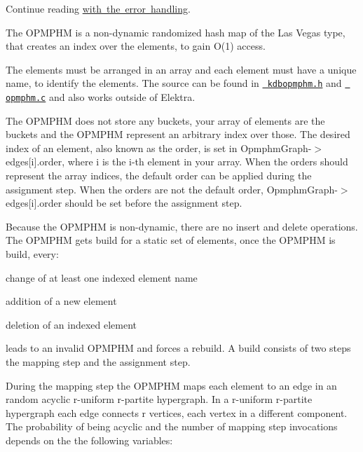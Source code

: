 Continue reading \mbox{\hyperlink{doc_dev_error-handling_md}{with the error handling}}.

The O\+P\+M\+P\+HM is a non-\/dynamic randomized hash map of the Las Vegas type, that creates an index over the elements, to gain O(1) access.

The elements must be arranged in an array and each element must have a unique name, to identify the elements. The source can be found in \href{/home/mpranj/workspace/libelektra/src/include/kdbopmphm.h}{\texttt{ kdbopmphm.\+h}} and \href{/home/mpranj/workspace/libelektra/src/libs/elektra/opmphm.c}{\texttt{ opmphm.\+c}} and also works outside of Elektra.

The O\+P\+M\+P\+HM does not store any buckets, your array of elements are the buckets and the O\+P\+M\+P\+HM represent an arbitrary index over those. The desired index of an element, also known as the order, is set in {\ttfamily Opmphm\+Graph-\/$>$edges\mbox{[}i\mbox{]}.order}, where {\ttfamily i} is the i-\/th element in your array. When the orders should represent the array indices, the default order can be applied during the assignment step. When the orders are not the default order, {\ttfamily Opmphm\+Graph-\/$>$edges\mbox{[}i\mbox{]}.order} should be set before the assignment step.

Because the O\+P\+M\+P\+HM is non-\/dynamic, there are no insert and delete operations. The O\+P\+M\+P\+HM gets build for a static set of elements, once the O\+P\+M\+P\+HM is build, every\+:


\begin{DoxyItemize}
\item change of at least one indexed element name
\item addition of a new element
\item deletion of an indexed element
\end{DoxyItemize}

leads to an invalid O\+P\+M\+P\+HM and forces a rebuild. A build consists of two steps the mapping step and the assignment step.

During the mapping step the O\+P\+M\+P\+HM maps each element to an edge in an random acyclic r-\/uniform r-\/partite hypergraph. In a r-\/uniform r-\/partite hypergraph each edge connects {\ttfamily r} vertices, each vertex in a different component. The probability of being acyclic and the number of mapping step invocations depends on the the following variables\+:


